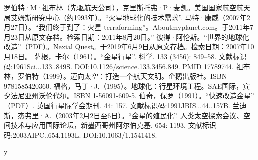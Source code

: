 \begin{enumerate}
 罗伯特·M·祖布林（先驱航天公司），克里斯托弗·P·麦凯。美国国家航空航天局艾姆斯研究中心（约1993年）。“火星地球化的技术需求”.
 马特·康威（2007年2月27日）。“我们终于到了：火星 terraforming”。Aboutmyplanet.com。于2011年7月23日从原文存档。检索日期：2011年8月20日。”
 彼得·阿伦斯。“世界的地球化改造”（PDF）。Nexial Quest。于2019年6月9日从原文存档。检索日期：2007年10月18日。
 萨根，卡尔（1961）。“金星行星”. 科学. 133 (3456): 849–58. 文献标识码:1961Sci...133..849S. DOI:10.1126/science.133.3456.849. PMID 17789744.
 祖布林，罗伯特（1999）。迈向太空：打造一个航天文明。企鹅出版社。ISBN 9781585420360.
 福格，马丁·J.（1995）。地球化：行星环境工程。SAE国际，宾夕法尼亚州沃伦代尔。ISBN 1-56091-609-5.
 伯奇，保罗（1991）。“快速改造金星” （PDF）. 英国行星际学会期刊. 44: 157. 文献标识码:1991JBIS...44..157B.
 兰迪斯，杰弗里·A.（2003年2月2日至6日）。“金星的殖民化”. 人类太空探索会议、空间技术与应用国际论坛，新墨西哥州阿尔伯克基. 654: 1193. 文献标识码:2003AIPC..654.1193L. DOI:10.1063/1.1541418.
\end{enumerate}
y
